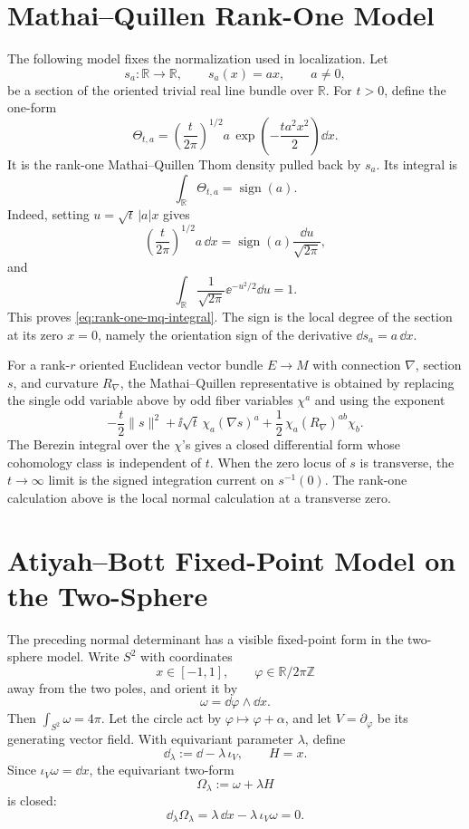 \section{Mathai--Quillen Rank-One Model}

The following model fixes the normalization used in localization.  Let
\[
  s_a:\mathbb R\longrightarrow\mathbb R,\qquad s_a(x)=a x,
  \qquad a\ne0 ,
\]
be a section of the oriented trivial real line bundle over \(\mathbb R\).
For \(t>0\), define the one-form
\[
  \Theta_{t,a}
  =
  \left(\frac{t}{2\pi}\right)^{1/2}
  a\,\exp\!\left(-\frac{t a^2x^2}{2}\right)\dd x .
\]
It is the rank-one Mathai--Quillen Thom density pulled back by \(s_a\).  Its
integral is
\begin{equation}
  \int_{\mathbb R}\Theta_{t,a}
  =
  \operatorname{sign}(a).
  \label{eq:rank-one-mq-integral}
\end{equation}
Indeed, setting \(u=\sqrt t\,|a|x\) gives
\[
  \left(\frac{t}{2\pi}\right)^{1/2}
  a\,\dd x
  =
  \operatorname{sign}(a)\frac{\dd u}{\sqrt{2\pi}},
\]
and
\[
  \int_{\mathbb R}\frac{1}{\sqrt{2\pi}}\ee^{-u^2/2}\dd u=1.
\]
This proves \eqref{eq:rank-one-mq-integral}.  The sign is the local degree of
the section at its zero \(x=0\), namely the orientation sign of the derivative
\(\dd s_a=a\,\dd x\).

For a rank-\(r\) oriented Euclidean vector bundle \(E\to M\) with connection
\(\nabla\), section \(s\), and curvature \(R_\nabla\), the Mathai--Quillen
representative is obtained by replacing the single odd variable above by odd
fiber variables \(\chi^a\) and using the exponent
\[
  -\frac{t}{2}\|s\|^2
  +\ii\sqrt t\,\chi_a(\nabla s)^a
  +\frac12\,\chi_a(R_\nabla)^{ab}\chi_b .
\]
The Berezin integral over the \(\chi\)'s gives a closed differential form
whose cohomology class is independent of \(t\).  When the zero locus of \(s\)
is transverse, the \(t\to\infty\) limit is the signed integration current on
\(s^{-1}(0)\).  The rank-one calculation above is the local normal
calculation at a transverse zero.

\section{Atiyah--Bott Fixed-Point Model on the Two-Sphere}
\label{sec:atiyah-bott-s2-model}

The preceding normal determinant has a visible fixed-point form in the
two-sphere model.  Write \(S^2\) with coordinates
\[
  x\in[-1,1],\qquad \varphi\in\mathbb R/2\pi\mathbb Z
\]
away from the two poles, and orient it by
\[
  \omega=\dd\varphi\wedge\dd x .
\]
Then \(\int_{S^2}\omega=4\pi\).  Let the circle act by
\(\varphi\mapsto\varphi+\alpha\), and let \(V=\partial_\varphi\) be its
generating vector field.  With equivariant parameter \(\lambda\), define
\[
  \dd_\lambda:=\dd-\lambda\,\iota_V,
  \qquad
  H=x .
\]
Since \(\iota_V\omega=\dd x\), the equivariant two-form
\[
  \Omega_\lambda:=\omega+\lambda H
\]
is closed:
\[
  \dd_\lambda\Omega_\lambda
  =
  \lambda\,\dd x-\lambda\,\iota_V\omega=0 .
\]

